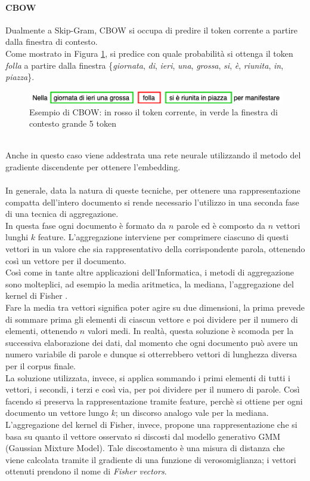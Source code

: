 \documentclass[12pt]{report}
\theoremstyle{definition}
\begin{document}
\paragraph{CBOW}
Dualmente a Skip-Gram, CBOW si occupa di predire il token corrente a partire dalla finestra di contesto.
\\
Come mostrato in Figura \ref{cbow}, si predice con quale probabilità si ottenga il token \textit{folla} a partire dalla finestra \{\textit{giornata}, \textit{di}, \textit{ieri}, \textit{una}, \textit{grossa}, \textit{si}, \textit{è}, \textit{riunita}, \textit{in}, \textit{piazza}\}.
\\
\begin{figure}
    \centering
    \includegraphics[scale = 0.7]{images/cbow.png}
    \caption{Esempio di CBOW: in rosso il token corrente, in verde la finestra di contesto grande 5 token}
    \label{cbow}
\end{figure}
\\
Anche in questo caso viene addestrata una rete neurale utilizzando il metodo del gradiente discendente per ottenere l'embedding.
\\
\\
In generale, data la natura di queste tecniche, per ottenere una rappresentazione compatta dell'intero documento si rende necessario l'utilizzo in una seconda fase di una tecnica di aggregazione.
\\
In questa fase ogni documento è formato da $n$ parole ed è composto da $n$ vettori lunghi $k$ feature. L'aggregazione interviene per comprimere ciascuno di questi vettori in un valore che sia rappresentativo della corrispondente parola, ottenendo così un vettore per il documento.
\\
Così come in tante altre applicazioni dell'Informatica, i metodi di aggregazione sono molteplici, ad esempio la media aritmetica, la mediana, l'aggregazione del kernel di Fisher \cite{19}.
\\
Fare la media tra vettori significa poter agire su due dimensioni, la prima prevede di sommare prima gli elementi di ciascun vettore e poi dividere per il numero di elementi, ottenendo $n$ valori medi. In realtà, questa soluzione è scomoda per la successiva elaborazione dei dati, dal momento che ogni documento può avere un numero variabile di parole e dunque si otterrebbero vettori di lunghezza diversa per il corpus finale.
\\
La soluzione utilizzata, invece, si applica sommando i primi elementi di tutti i vettori, i secondi, i terzi e così via, per poi dividere per il numero di parole. Così facendo si preserva la rappresentazione tramite feature, perchè si ottiene per ogni documento un vettore lungo $k$; un discorso analogo vale per la mediana.
\\
L'aggregazione del kernel di Fisher, invece, propone una rappresentazione che si basa su quanto il vettore osservato si discosti dal modello generativo GMM (Gaussian Mixture Model). Tale discostamento è una misura di distanza che viene calcolata tramite il gradiente di una funzione di verosomiglianza; i vettori ottenuti prendono il nome di \textit{Fisher vectors}.
\end{document}
